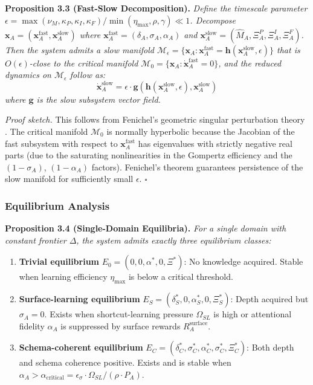 \documentclass[11pt,a4paper]{article}
\begin{document}
\textbf{Proposition 3.3 (Fast-Slow Decomposition).}
\textit{Define the timescale parameter
$\epsilon = \max(\nu_M, \kappa_P, \kappa_I, \kappa_F) / \min(\eta_{\max}, \rho, \gamma) \ll 1$.
Decompose $\mathbf{x}_A = (\mathbf{x}_A^{\text{fast}}, \mathbf{x}_A^{\text{slow}})$ where
$\mathbf{x}_A^{\text{fast}} = (\delta_A, \sigma_A, \alpha_A)$ and
$\mathbf{x}_A^{\text{slow}} = (\hat{M}_A, \Xi_A^P, \Xi_A^I, \Xi_A^F)$.
Then the system admits a slow manifold
$\mathcal{M}_\epsilon = \{ \mathbf{x}_A : \mathbf{x}_A^{\text{fast}} = \mathbf{h}(\mathbf{x}_A^{\text{slow}}, \epsilon) \}$
that is $O(\epsilon)$-close to the critical manifold
$\mathcal{M}_0 = \{ \mathbf{x}_A : \dot{\mathbf{x}}_A^{\text{fast}} = 0 \}$,
and the reduced dynamics on $\mathcal{M}_\epsilon$ follow as:
\begin{equation}\label{eq:reduced-dynamics}
\dot{\mathbf{x}}_A^{\text{slow}} = \epsilon \cdot \mathbf{g}(\mathbf{h}(\mathbf{x}_A^{\text{slow}}, \epsilon), \mathbf{x}_A^{\text{slow}})
\end{equation}
where $\mathbf{g}$ is the slow subsystem vector field.}

\textit{Proof sketch.} This follows from Fenichel's geometric singular
perturbation theory \citep{fenichel1979geometric}. The critical manifold
$\mathcal{M}_0$ is normally hyperbolic because the Jacobian of the fast
subsystem with respect to $\mathbf{x}_A^{\text{fast}}$ has eigenvalues
with strictly negative real parts (due to the saturating nonlinearities
in the Gompertz efficiency and the $(1-\sigma_A)$, $(1-\alpha_A)$ factors).
Fenichel's theorem guarantees persistence of the slow manifold for
sufficiently small $\epsilon$. $\square$

\subsubsection{Equilibrium Analysis}\label{sec:equilibrium}

\textbf{Proposition 3.4 (Single-Domain Equilibria).}
\textit{For a single domain with constant frontier $\Delta$, the system
admits exactly three equilibrium classes:}
\begin{enumerate}[nosep]
\item \textbf{Trivial equilibrium} $E_0 = (0, 0, \alpha^*, 0, \Xi^*)$: No knowledge acquired. Stable when learning efficiency $\eta_{\max}$ is below a critical threshold.
\item \textbf{Surface-learning equilibrium} $E_S = (\delta_S^*, 0, \alpha_S^*, 0, \Xi_S^*)$: Depth acquired but $\sigma_A = 0$. Exists when shortcut-learning pressure $\Omega_{SL}$ is high or attentional fidelity $\alpha_A$ is suppressed by surface rewards $R_A^{\text{surface}}$.
\item \textbf{Schema-coherent equilibrium} $E_C = (\delta_C^*, \sigma_C^*, \alpha_C^*, \sigma_C^*, \Xi_C^*)$: Both depth and schema coherence positive. Exists and is stable when $\alpha_A > \alpha_{\text{critical}} = \epsilon_\sigma \cdot \Omega_{SL} / (\rho \cdot P_A)$.
\end{enumerate}
\end{document}
